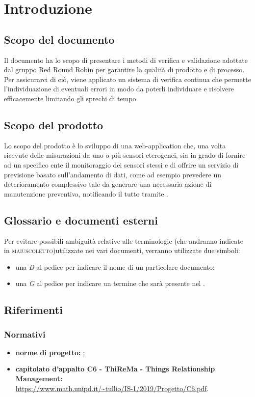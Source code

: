 \section{Introduzione}
	\subsection{Scopo del documento}
		Il documento ha lo scopo di presentare i metodi di verifica e validazione adottate dal gruppo Red Round Robin per garantire la qualità di prodotto e di processo. Per assicurarci di ciò, viene applicato un sistema di verifica continua che permette l'individuazione di eventuali errori in modo da poterli individuare e risolvere efficacemente limitando gli sprechi di tempo.
	\subsection{Scopo del prodotto}
		Lo scopo del prodotto è lo sviluppo di una web-application che, una volta ricevute delle misurazioni da uno o più sensori eterogenei, sia in grado di fornire ad un specifico ente il monitoraggio dei sensori stessi e di offrire un servizio di previsione basato sull'andamento di dati, come ad esempio prevedere un deterioramento complessivo tale da generare una necessaria azione di manutenzione preventiva, notificando il tutto tramite .

	\subsection{Glossario e documenti esterni}
		Per evitare possibili ambiguità relative alle terminologie (che andranno indicate in \textsc{maiuscoletto})utilizzate nei vari documenti, verranno utilizzate due simboli:
		\begin{itemize}
			\item una \textit{D} al pedice per indicare il nome di un particolare documento;
			\item una \textit{G} al pedice per indicare un termine che sarà
			presente nel .
		\end{itemize}

	\subsection{Riferimenti}
		\subsubsection{Normativi}
		\begin{itemize}
			\item \textbf{norme di progetto:} ;
			\item \textbf{capitolato d'appalto C6 - ThiReMa - Things Relationship Management:}\\
			\url{https://www.math.unipd.it/~tullio/IS-1/2019/Progetto/C6.pdf}.
		\end{itemize}
